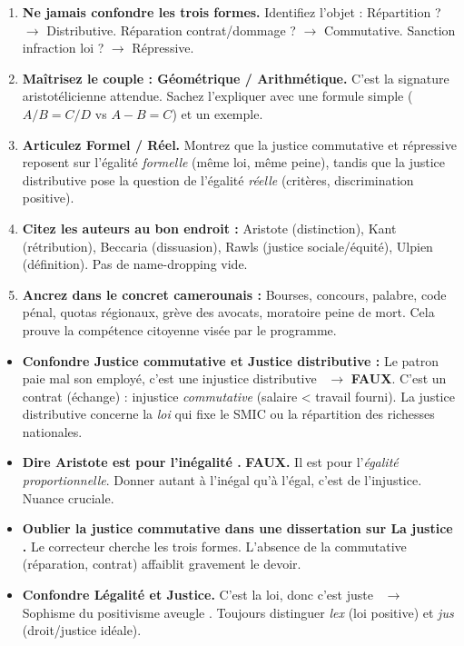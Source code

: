 \documentclass[11pt]{article}
\newcommand{\cle}[1]{{\popxbold\color{popdark}#1}}
\begin{document}
\begin{methode}
\begin{enumerate}
    \item \textbf{Ne jamais confondre les trois formes.} Identifiez l'objet : Répartition ? $\rightarrow$ Distributive. Réparation contrat/dommage ? $\rightarrow$ Commutative. Sanction infraction loi ? $\rightarrow$ Répressive.
    \item \textbf{Maîtrisez le couple : Géométrique / Arithmétique.} C'est la signature aristotélicienne attendue. Sachez l'expliquer avec une formule simple ($A/B=C/D$ vs $A-B=C$) et un exemple.
    \item \textbf{Articulez Formel / Réel.} Montrez que la justice commutative et répressive reposent sur l'égalité \emph{formelle} (même loi, même peine), tandis que la justice distributive pose la question de l'égalité \emph{réelle} (critères, discrimination positive).
    \item \textbf{Citez les auteurs au bon endroit :} Aristote (distinction), Kant (rétribution), Beccaria (dissuasion), Rawls (justice sociale/équité), Ulpien (définition). Pas de name-dropping vide.
    \item \textbf{Ancrez dans le concret camerounais :} Bourses, concours, palabre, code pénal, quotas régionaux, grève des avocats, moratoire peine de mort. Cela prouve la \cle{compétence citoyenne} visée par le programme.
\end{enumerate}
\end{methode}

\begin{attention}
\begin{itemize}
    \item \textbf{Confondre Justice commutative et Justice distributive :} \guillemotleft Le patron paie mal son employé, c'est une injustice distributive \guillemotright\ $\rightarrow$ \textbf{FAUX}. C'est un contrat (échange) : injustice \emph{commutative} (salaire < travail fourni). La justice distributive concerne la \emph{loi} qui fixe le SMIC ou la répartition des richesses nationales.
    \item \textbf{Dire \guillemotleft Aristote est pour l'inégalité \guillemotright.} \textbf{FAUX.} Il est pour l'\emph{égalité proportionnelle}. Donner autant à l'inégal qu'à l'égal, c'est de l'injustice. Nuance cruciale.
    \item \textbf{Oublier la justice commutative dans une dissertation sur \guillemotleft La justice \guillemotright.} Le correcteur cherche les trois formes. L'absence de la commutative (réparation, contrat) affaiblit gravement le devoir.
    \item \textbf{Confondre Légalité et Justice.} \guillemotleft C'est la loi, donc c'est juste \guillemotright\ $\rightarrow$ Sophisme du \guillemotleft positivisme aveugle \guillemotright. Toujours distinguer \emph{lex} (loi positive) et \emph{jus} (droit/justice idéale).
\end{itemize}
\end{attention}
\end{document}
